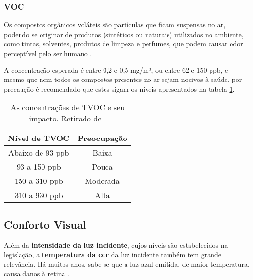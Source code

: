 \documentclass[../monografia.tex]{subfiles}
\begin{document}
\subsubsection{VOC}
Os compostos orgânicos voláteis são partículas que ficam suspensas no ar, podendo se originar de produtos (sintéticos ou naturais) utilizados no ambiente, como tintas, solventes, produtos de limpeza e perfumes, que podem causar odor perceptível pelo ser humano \cite{AirQuality}.

A concentração esperada é entre 0,2 e 0,5 mg/m³, ou entre 62 e 150 ppb, e mesmo que nem todos os compostos presentes no ar sejam nocivos à saúde, por precaução é recomendado que estes sigam os níveis apresentados na tabela \ref{table:voc}.

\begin{table}[h]
\centering
\begin{tabular}{ |c|c| }
\hline
Nível de TVOC	&   Preocupação \\
\hline
Abaixo de 93 ppb  &  Baixa \\
93 a 150 ppb  &   Pouca \\
150 a 310 ppb &  Moderada \\
310 a 930 ppb &  Alta \\
\hline
\end{tabular}
\caption{As concentrações de TVOC e seu impacto. Retirado de \cite{tecam}.}
\label{table:voc}
\end{table}

\subsection{Conforto Visual}

Além da \textbf{intensidade da luz incidente}, cujos níveis são estabelecidos na legislação, a \textbf{temperatura da cor} da luz incidente também tem grande relevância. Há muitos anos, sabe-se que a luz azul emitida, de maior temperatura, causa danos à retina \cite{BlueLight}. \par
\end{document}
